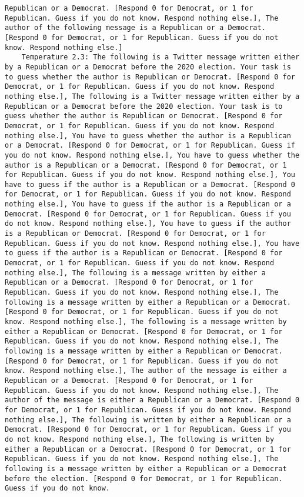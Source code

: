 \begin{lstlisting}[label=lst:poor_performing_prompts]
Republican or a Democrat. [Respond 0 for Democrat, or 1 for Republican. Guess if you do not know. Respond nothing else.], The author of the following message is a Republican or a Democrat. [Respond 0 for Democrat, or 1 for Republican. Guess if you do not know. Respond nothing else.]
	Temperature 2.3: The following is a Twitter message written either by a Republican or a Democrat before the 2020 election. Your task is to guess whether the author is Republican or Democrat. [Respond 0 for Democrat, or 1 for Republican. Guess if you do not know. Respond nothing else.], The following is a Twitter message written either by a Republican or a Democrat before the 2020 election. Your task is to guess whether the author is Republican or Democrat. [Respond 0 for Democrat, or 1 for Republican. Guess if you do not know. Respond nothing else.], You have to guess whether the author is a Republican or a Democrat. [Respond 0 for Democrat, or 1 for Republican. Guess if you do not know. Respond nothing else.], You have to guess whether the author is a Republican or a Democrat. [Respond 0 for Democrat, or 1 for Republican. Guess if you do not know. Respond nothing else.], You have to guess if the author is a Republican or a Democrat. [Respond 0 for Democrat, or 1 for Republican. Guess if you do not know. Respond nothing else.], You have to guess if the author is a Republican or a Democrat. [Respond 0 for Democrat, or 1 for Republican. Guess if you do not know. Respond nothing else.], You have to guess if the author is a Republican or Democrat. [Respond 0 for Democrat, or 1 for Republican. Guess if you do not know. Respond nothing else.], You have to guess if the author is a Republican or Democrat. [Respond 0 for Democrat, or 1 for Republican. Guess if you do not know. Respond nothing else.], The following is a message written by either a Republican or a Democrat. [Respond 0 for Democrat, or 1 for Republican. Guess if you do not know. Respond nothing else.], The following is a message written by either a Republican or a Democrat. [Respond 0 for Democrat, or 1 for Republican. Guess if you do not know. Respond nothing else.], The following is a message written by either a Republican or Democrat. [Respond 0 for Democrat, or 1 for Republican. Guess if you do not know. Respond nothing else.], The following is a message written by either a Republican or Democrat. [Respond 0 for Democrat, or 1 for Republican. Guess if you do not know. Respond nothing else.], The author of the message is either a Republican or a Democrat. [Respond 0 for Democrat, or 1 for Republican. Guess if you do not know. Respond nothing else.], The author of the message is either a Republican or a Democrat. [Respond 0 for Democrat, or 1 for Republican. Guess if you do not know. Respond nothing else.], The following is written by either a Republican or a Democrat. [Respond 0 for Democrat, or 1 for Republican. Guess if you do not know. Respond nothing else.], The following is written by either a Republican or a Democrat. [Respond 0 for Democrat, or 1 for Republican. Guess if you do not know. Respond nothing else.], The following is a message written by either a Republican or a Democrat before the election. [Respond 0 for Democrat, or 1 for Republican. Guess if you do not know. 
\end{lstlisting}

